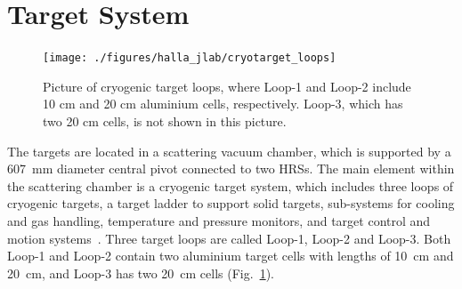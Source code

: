 \section{Target System}
 \begin{figure}[!ht]
 \begin{center}
  \texttt{[image: ./figures/halla\_jlab/cryotarget\_loops]}
  \caption[Picture of cryogenic target loops]{\footnotesize{Picture of cryogenic target loops, where Loop-1 and Loop-2 include 10 cm and 20 cm aluminium cells, respectively. Loop-3, which has two 20 cm cells, is not shown in this picture.}}
  \label{cryotarget_loop}
 \end{center}
\end{figure}
  The targets are located in a scattering vacuum chamber, which is supported by a 607~mm diameter central pivot connected to two HRSs. The main element within the scattering chamber is a cryogenic target system, which includes three loops of cryogenic targets, a target ladder to support solid targets, sub-systems for cooling and gas handling, temperature and pressure monitors, and target control and motion systems~\cite{halla_nim}. Three target loops are called Loop-1, Loop-2 and Loop-3. Both Loop-1 and Loop-2 contain two aluminium target cells with lengths of 10~cm and 20~cm, and Loop-3 has two 20~cm cells (Fig.~\ref{cryotarget_loop}).
